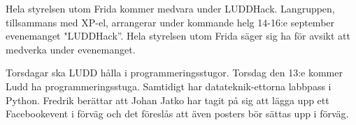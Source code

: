 \documentclass{protokoll}
\begin{document}
Hela styrelsen utom Frida kommer medvara under LUDDHack. 
Langruppen, tillsammans med XP-el, arrangerar under kommande helg 14-16:e september evenemanget "LUDDHack''. Hela styrelsen utom Frida säger sig ha för avsikt att medverka under evenemanget.

Torsdagar ska LUDD hålla i programmeringsstugor.  
Torsdag den 13:e kommer Ludd ha programmeringsstuga. Samtidigt har datateknik-ettorna labbpass i Python. Fredrik berättar att Johan Jatko har tagit på sig att lägga upp ett Facebookevent i förväg och det föreslås att även posters bör sättas upp i förväg. 
\end{document}
